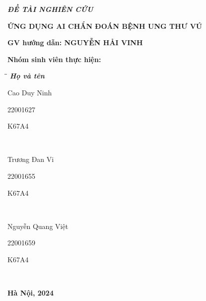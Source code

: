 \documentclass[a4paper]{article}
\begin{document}
\begin{titlepage}
\begin{flushleft}
    \fontsize{14pt}{17pt}\selectfont  
    \centering \textbf{\textsl{ĐỀ TÀI NGHIÊN CỨU}}
\end{flushleft}

\begin{center}
    \fontsize{18pt}{17pt}\selectfont 
    \textbf{\textrm{ỨNG DỤNG AI CHẨN ĐOÁN BỆNH UNG THƯ VÚ}}
\end{center}

\vspace{15pt}
\textbf{GV hướng dẫn: NGUYỄN HẢI VINH}

\vspace{10pt}
\textbf{Nhóm sinh viên thực hiện:}

\begin{tabbing}
\hspace{8cm}\=\hspace{3cm}\=\hspace{3cm} \kill
{\it \textbf{Họ và tên}}\\
\begin{bfseries}Cao Duy Ninh\end{bfseries}\> \begin{bfseries}22001627\end{bfseries}\> \begin{bfseries}K67A4\end{bfseries}\\
\begin{bfseries}Trương Đan Vi\end{bfseries}\> \begin{bfseries}22001655\end{bfseries}\> \begin{bfseries}K67A4\end{bfseries}\\
\begin{bfseries}Nguyễn Quang Việt\end{bfseries}\> \begin{bfseries}22001659\end{bfseries}\> \begin{bfseries}K67A4\end{bfseries}\\


\end{tabbing}

\vspace{10pt}
\begin{center}
    \textbf{Hà Nội, 2024}
\end{center}
\end{titlepage}
\restoregeometry
\end{document}
